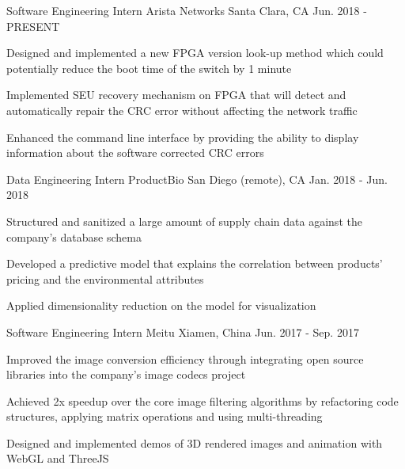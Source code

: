

\begin{cventries}

  \cventry
    {Software Engineering Intern} %
    {Arista Networks} %
    {Santa Clara, CA} %
    {Jun. 2018 - PRESENT} %
    {
      \begin{cvitems} %
        \item {Designed and implemented a new FPGA version look-up method which could potentially reduce the boot time of the switch by 1 minute}
        \item {Implemented SEU recovery mechanism on FPGA that will detect and automatically repair the CRC error without affecting the network traffic}
        \item {Enhanced the command line interface by providing the ability to display information about the software corrected CRC errors}
      \end{cvitems}
    }

  \cventry
    {Data Engineering Intern} %
    {ProductBio} %
    {San Diego (remote), CA} %
    {Jan. 2018 - Jun. 2018} %
    {
      \begin{cvitems} %
        \item {Structured and sanitized a large amount of supply chain data against the company's database schema}
        \item {Developed a predictive model that explains the correlation between products' pricing and the environmental attributes}
        \item {Applied dimensionality reduction on the model for visualization}
      \end{cvitems}
    }
    
  \cventry
    {Software Engineering Intern} %
    {Meitu} %
    {Xiamen, China} %
    {Jun. 2017 - Sep. 2017} %
    {
      \begin{cvitems} %
        \item {Improved the image conversion efficiency through integrating open source libraries into the company's image codecs project}
        \item {Achieved 2x speedup over the core image filtering algorithms by refactoring code structures, applying matrix operations and using multi-threading}
        \item {Designed and implemented demos of 3D rendered images and animation with WebGL and ThreeJS}
      \end{cvitems}
    }


\end{cventries}
